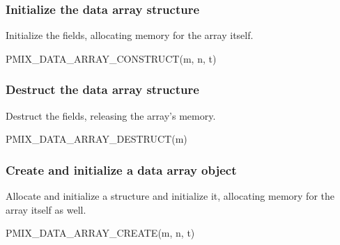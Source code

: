 \subsubsection{Initialize the data array structure}

Initialize the  fields, allocating memory for the array itself.

\cspecificstart
\begin{codepar}
PMIX_DATA_ARRAY_CONSTRUCT(m, n, t)
\end{codepar}
\cspecificend

\begin{arglist}
\end{arglist}

\subsubsection{Destruct the data array structure}

Destruct the  fields, releasing the array's memory.

\cspecificstart
\begin{codepar}
PMIX_DATA_ARRAY_DESTRUCT(m)
\end{codepar}
\cspecificend

\begin{arglist}
\end{arglist}

\subsubsection{Create and initialize a data array object}

Allocate and initialize a  structure and initialize it, allocating memory for the array itself as well.

\cspecificstart
\begin{codepar}
PMIX_DATA_ARRAY_CREATE(m, n, t)
\end{codepar}
\cspecificend

